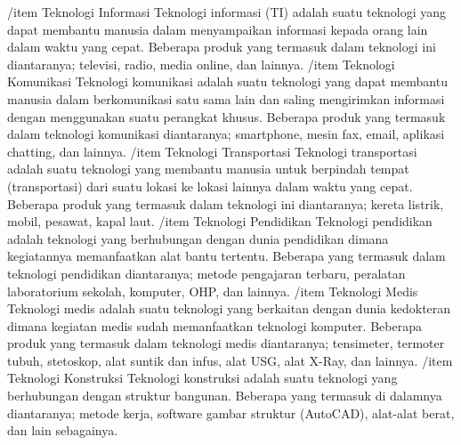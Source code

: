 /item Teknologi Informasi
Teknologi informasi (TI) adalah suatu teknologi yang dapat membantu manusia dalam menyampaikan informasi kepada orang lain dalam waktu yang cepat. Beberapa produk yang termasuk dalam teknologi ini diantaranya; televisi, radio, media online, dan lainnya.
/item Teknologi Komunikasi
Teknologi komunikasi adalah suatu teknologi yang dapat membantu manusia dalam berkomunikasi satu sama lain dan saling mengirimkan informasi dengan menggunakan suatu perangkat khusus. Beberapa produk yang termasuk dalam teknologi komunikasi diantaranya; smartphone, mesin fax, email, aplikasi chatting, dan lainnya.
/item Teknologi Transportasi
Teknologi transportasi adalah suatu teknologi yang membantu manusia untuk berpindah tempat (transportasi) dari suatu lokasi ke lokasi lainnya dalam waktu yang cepat. Beberapa produk yang termasuk dalam teknologi ini diantaranya; kereta listrik, mobil, pesawat, kapal laut.
/item Teknologi Pendidikan
Teknologi pendidikan adalah teknologi yang berhubungan dengan dunia pendidikan dimana kegiatannya memanfaatkan alat bantu tertentu. Beberapa yang termasuk dalam teknologi pendidikan diantaranya; metode pengajaran terbaru, peralatan laboratorium sekolah, komputer, OHP, dan lainnya.
/item Teknologi Medis
Teknologi medis adalah suatu teknologi yang berkaitan dengan dunia kedokteran dimana kegiatan medis sudah memanfaatkan teknologi komputer. Beberapa produk yang termasuk dalam teknologi medis diantaranya; tensimeter, termoter tubuh, stetoskop, alat suntik dan infus, alat USG, alat X-Ray, dan lainnya.
/item Teknologi Konstruksi
Teknologi konstruksi adalah suatu teknologi yang berhubungan dengan struktur bangunan. Beberapa yang termasuk di dalamnya diantaranya; metode kerja, software gambar struktur (AutoCAD), alat-alat berat, dan lain sebagainya.


